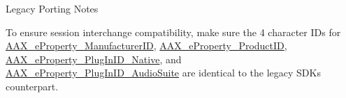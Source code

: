 \begin{DoxyRefDesc}{Legacy Porting Notes}
\item[\hyperlink{a00384__porting_notes000040}{Legacy Porting Notes}]To ensure session interchange compatibility, make sure the 4 character I\+Ds for \hyperlink{a00283_a6571f4e41a5dd06e4067249228e2249ea996465cca29a2a15291d1c788ac5728c}{A\+A\+X\+\_\+e\+Property\+\_\+\+Manufacturer\+I\+D}, \hyperlink{a00283_a6571f4e41a5dd06e4067249228e2249ea3a41fcdff5af1a4fd19dcbca7b1ba6f3}{A\+A\+X\+\_\+e\+Property\+\_\+\+Product\+I\+D}, \hyperlink{a00283_a6571f4e41a5dd06e4067249228e2249ea89ca3dd6e96895cda14976c1b1ceb826}{A\+A\+X\+\_\+e\+Property\+\_\+\+Plug\+In\+I\+D\+\_\+\+Native}, and \hyperlink{a00283_a6571f4e41a5dd06e4067249228e2249ead3344696b8298a8b254add3d039ea927}{A\+A\+X\+\_\+e\+Property\+\_\+\+Plug\+In\+I\+D\+\_\+\+Audio\+Suite} are identical to the legacy S\+D\+K\textquotesingle{}s counterpart.\end{DoxyRefDesc}
